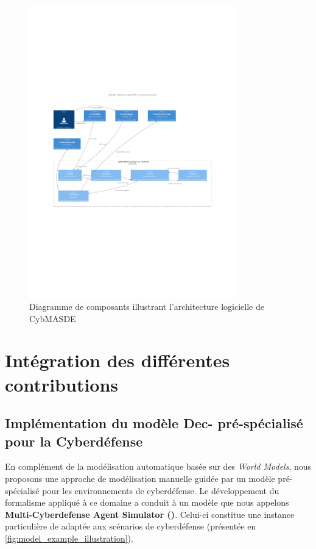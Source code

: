 \begin{figure}
  \centering
  \includegraphics[trim={2.25cm 9cm 2.25cm 10cm},clip,width=0.8\textwidth]{figures/CybMASDE_internal_component_diagram.pdf}
  \caption{Diagramme de composants  illustrant l'architecture logicielle de CybMASDE}
  \label{fig:cybmasde_uml}
\end{figure}

\section{Intégration des différentes contributions}

\subsection{Implémentation du modèle Dec- pré-spécialisé pour la Cyberdéfense}

En complément de la modélisation automatique basée sur des \textit{World Models}, nous proposons une approche de modélisation manuelle guidée par un modèle pré-spécialisé pour les environnements de cyberdéfense.
Le développement du formalisme  appliqué à ce domaine a conduit à un modèle que nous appelons \textbf{Multi-Cyberdefense Agent Simulator ()}. Celui-ci constitue une instance particulière de  adaptée aux scénarios de cyberdéfense (présentée en \autoref{fig:model_example_illustration}).

